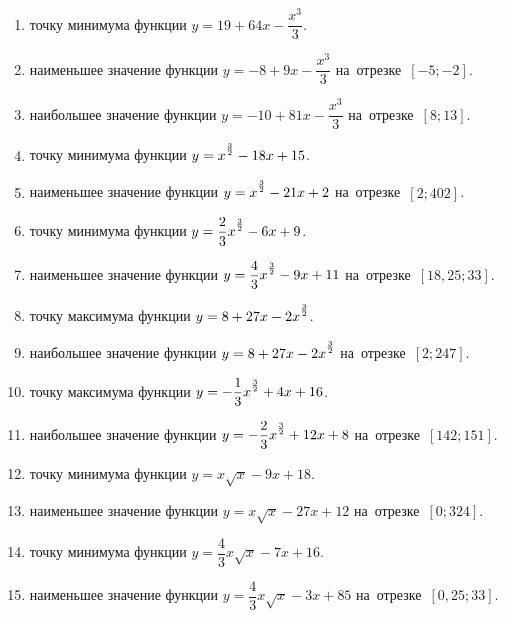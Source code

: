 \documentclass[a4paper,10pt]{article}
\begin{document}
\begin{enumerate}
\item {} точку минимума функции $y=19 +64x-\dfrac{x^3}{3}$.

\item {} наименьшее значение функции $y=-8 +9x-\dfrac{x^3}{3}$ на~отрезке~$\left[-5;-2\right]$.

\item {} наибольшее значение функции $y=-10 +81x-\dfrac{x^3}{3}$ на~отрезке~$\left[8;13\right]$.

\item {} точку минимума функции $y=x\strut^{\frac{3}{2}} -18x+15$.

\item {} наименьшее значение функции $y=x\strut^{\frac{3}{2}} -21x+2$ на~отрезке~$\left[2;402\right]$.

\item {} точку минимума функции $y=\dfrac{2}{3}x\strut^{\frac{3}{2}} -6x+9$.

\item {} наименьшее значение функции $y=\dfrac{4}{3}x\strut^{\frac{3}{2}} -9x+11$ на~отрезке~$\left[18,25;33\right]$.

\item {} точку максимума функции $y=8+27x-2x\strut^{\frac{3}{2}}$.

\item {} наибольшее значение функции $y=8+27x-2x\strut^{\frac{3}{2}}$ на~отрезке~$\left[2;247\right]$.

\item {} точку максимума функции $y=-\dfrac{1}{3}x\strut^{\frac{3}{2}} +4x+16$.

\item {} наибольшее значение функции $y=-\dfrac{2}{3}x\strut^{\frac{3}{2}} +12x+8$ на~отрезке~$\left[142;151\right]$.

\item {} точку минимума функции $y=x\sqrt{x} -9x+18$.

\item {} наименьшее значение функции $y=x\sqrt{x} -27x+12$ на~отрезке~$\left[0;324\right]$.

\item {} точку минимума функции $y=\dfrac{4}{3}x\sqrt{x} -7x+16$.

\item {} наименьшее значение функции $y=\dfrac{4}{3}x\sqrt{x} -3x+85$ на~отрезке~$\left[0,25;33\right]$.


\end{enumerate}
\end{document}
